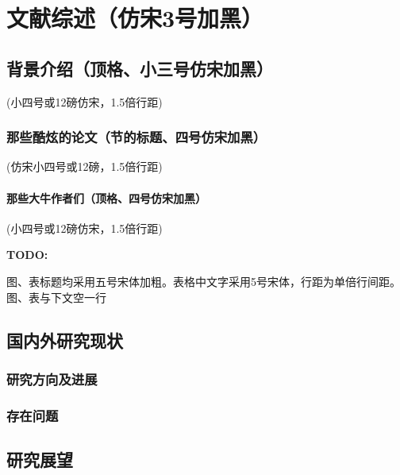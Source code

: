 \chapter{文献综述（仿宋3号加黑）}
\section{背景介绍（顶格、小三号仿宋加黑）}
(小四号或12磅仿宋，1.5倍行距)

\subsection{那些酷炫的论文（节的标题、四号仿宋加黑）}
(仿宋小四号或12磅，1.5倍行距)
\subsubsection{那些大牛作者们（顶格、四号仿宋加黑）}
(小四号或12磅仿宋，1.5倍行距)

{\bfseries TODO:}

图、表标题均采用五号宋体加粗。表格中文字采用5号宋体，行距为单倍行间距。图、表与下文空一行
\section{国内外研究现状}
\subsection{研究方向及进展}
\subsection{存在问题}
\section{研究展望}

\lipsum[1]

\parencite{small}

\printbibliography[heading=secbib]